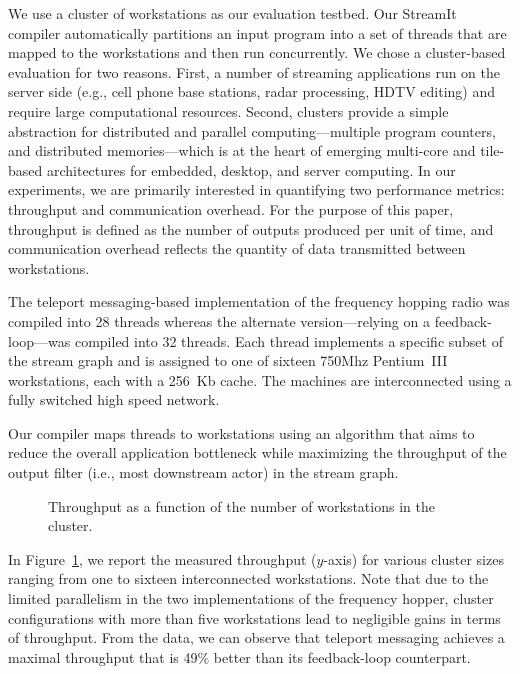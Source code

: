 We use a cluster of workstations as our evaluation testbed. Our
StreamIt compiler automatically partitions an input program into a set
of threads that are mapped to the workstations and then run concurrently.
We chose a cluster-based evaluation for two reasons. 
First, a number of streaming applications run on the server side
(e.g., cell phone base stations, radar processing, HDTV editing) and
require large computational resources. Second, clusters provide a
simple abstraction for distributed and parallel computing---multiple program
counters, and distributed memories---which 
is at the heart of emerging multi-core and tile-based architectures
for embedded, desktop, and server computing.
In our experiments, we are primarily interested in quantifying two
performance metrics: throughput and communication overhead.
For the purpose of this paper, throughput is defined
as the number of outputs produced per unit of time, and communication
overhead reflects the quantity of data transmitted between
workstations.

The teleport messaging-based implementation of the frequency hopping
radio was compiled into 28 threads
whereas the alternate version---relying on a feedback-loop---was
compiled into 32 threads.  Each thread implements a
specific subset of the stream graph  and is assigned to one of
sixteen 750Mhz Pentium~III workstations, each with a
256~Kb cache.  The machines are interconnected using a fully switched
high speed network.

Our compiler maps threads to workstations using an algorithm that aims
to reduce the overall application bottleneck while
maximizing the throughput of the output filter (i.e., most downstream
actor) in the stream graph.

\begin{figure}[t]
\caption{\small Throughput as a function of the number of workstations
in the cluster. 
\protect\label{fig:fhr-throughput}}
\end{figure}

In Figure~\ref{fig:fhr-throughput}, we report the measured throughput
($y$-axis) for various cluster sizes ranging from one to sixteen
interconnected workstations. Note that due to the limited parallelism
in the two implementations of the frequency hopper, cluster
configurations with more than five workstations lead to negligible
gains in terms of throughput. From the data, we can observe that
teleport messaging achieves a maximal throughput that is 49\% better
than its feedback-loop counterpart.  


